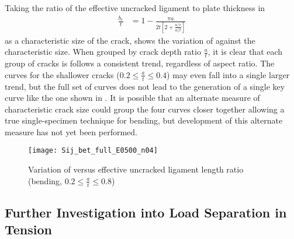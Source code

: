 Taking the ratio of the effective uncracked ligament to plate thickness in \cite{sharobeamlandes1994}
\begin{align}
\frac{b_e}{t} &= 1 - \frac{\pi a}{2t \left[ 2 + \frac{a/c}{a/t} \right]}
\end{align}
as a characteristic size of the crack,  shows the variation of \Sij against the characteristic size.
When grouped by crack depth ratio $\frac{a}{t}$, it is clear that each group of cracks is follows a consistent trend, regardless of aspect ratio.
The curves for the shallower cracks ($0.2 \leq \frac{a}{t} \leq 0.4$) may even fall into a single larger trend, but the full set of curves does not lead to the generation of a single key curve like the one shown in .
It is possible that an alternate measure of characteristic crack size could group the four curves closer together allowing a true single-specimen technique for bending, but development of this alternate measure has not yet been performed.
\begin{figure}[tbp]
\centering
\texttt{[image: Sij\_bet\_full\_E0500\_n04]}
\caption{Variation of \Sij versus effective uncracked ligament length ratio (bending, \(0.2 \leq \frac{a}{t} \leq 0.8\)) \label{fig:Sij_bet_full_E0500_n04}}
\end{figure}

\subsection{Further Investigation into Load Separation in Tension}

